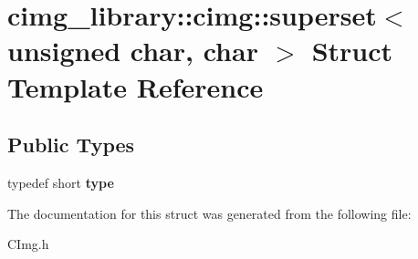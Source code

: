 \hypertarget{structcimg__library_1_1cimg_1_1superset_3_01unsigned_01char_00_01char_01_4}{\section{cimg\-\_\-library\-:\-:cimg\-:\-:superset$<$ unsigned char, char $>$ Struct Template Reference}
\label{structcimg__library_1_1cimg_1_1superset_3_01unsigned_01char_00_01char_01_4}
}
\subsection*{Public Types}
\begin{DoxyCompactItemize}
\item 
\hypertarget{structcimg__library_1_1cimg_1_1superset_3_01unsigned_01char_00_01char_01_4_aa50288ff225614dab1ae5a364c158f9e}{typedef short {\bfseries type}}\label{structcimg__library_1_1cimg_1_1superset_3_01unsigned_01char_00_01char_01_4_aa50288ff225614dab1ae5a364c158f9e}

\end{DoxyCompactItemize}


The documentation for this struct was generated from the following file\-:\begin{DoxyCompactItemize}
\item 
C\-Img.\-h\end{DoxyCompactItemize}
